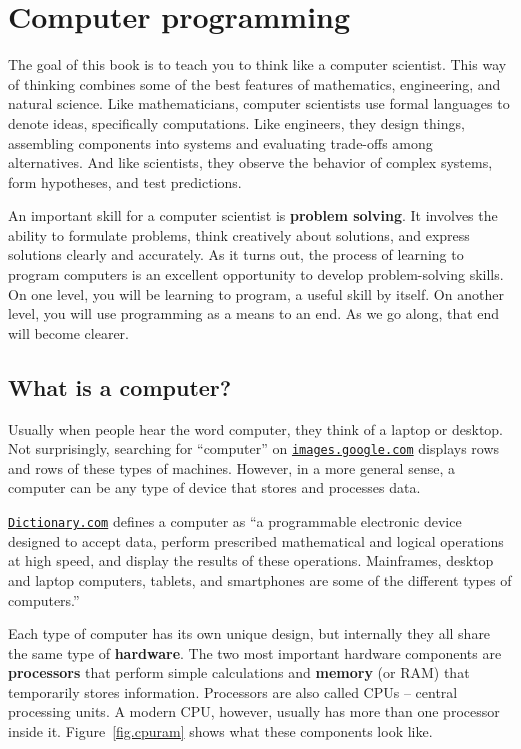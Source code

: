 \chapter{Computer programming}
\label{theway}

The goal of this book is to teach you to think like a computer scientist.
This way of thinking combines some of the best features of mathematics, engineering, and natural science.
Like mathematicians, computer scientists use formal languages to denote ideas, specifically computations.
Like engineers, they design things, assembling components into systems and evaluating trade-offs among alternatives.
And like scientists, they observe the behavior of complex systems, form hypotheses, and test predictions.


An important skill for a computer scientist is {\bf problem solving}.
It involves the ability to formulate problems, think creatively about solutions, and express solutions clearly and accurately.
As it turns out, the process of learning to program computers is an excellent opportunity to develop problem-solving skills.
On one level, you will be learning to program, a useful skill by itself.
On another level, you will use programming as a means to an end.
As we go along, that end will become clearer.


\section{What is a computer?}

Usually when people hear the word computer, they think of a laptop or desktop.
Not surprisingly, searching for ``computer'' on \href{https://images.google.com/}{\tt images.google.com}
displays rows and rows of these types of machines.
However, in a more general sense, a computer can be any type of device that stores and processes data.

\href{http://www.dictionary.com/browse/computer}{\tt Dictionary.com} defines a computer as ``a programmable electronic device designed to accept data, perform prescribed mathematical and logical operations at high speed, and display the results of these operations.
Mainframes, desktop and laptop computers, tablets, and smartphones are some of the different types of computers.''


Each type of computer has its own unique design, but internally they all share the same type of {\bf hardware}.
The two most important hardware components are {\bf processors} that perform simple calculations and 
{\bf memory} (or RAM) that temporarily stores information.
Processors are also called CPUs -- central processing units. A modern CPU, however, usually has more than one processor inside it.
Figure~\ref{fig.cpuram} shows what these components look like.

